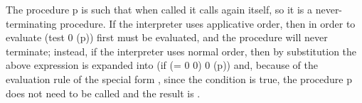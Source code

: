The procedure \code p is such that when called it calls again itself, so it is a never-terminating procedure.
If the interpreter uses applicative order, then in order to evaluate
\begtt{}
(test 0 (p))
\endtt
first  must be evaluated, and the procedure will never terminate;  instead, if the interpreter uses normal order, then by substitution the above expression is expanded into
\begtt{}
(if (= 0 0) 0 (p))
\endtt
and, because of the evaluation rule of the special form , since the condition  is true, the procedure \code p does not need to be called and the result is .
